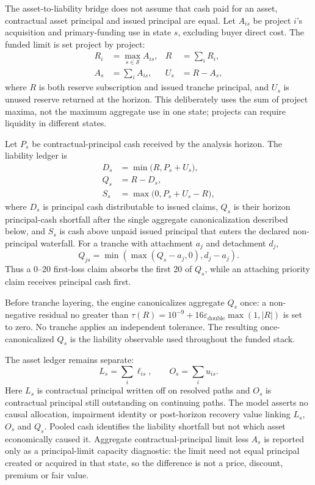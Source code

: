 \documentclass[11pt,a4paper]{article}
\begin{document}
The asset-to-liability bridge does not assume that cash paid for an asset, contractual asset principal and issued principal are equal. Let \(A_{is}\) be project \(i\)'s acquisition and primary-funding use in state \(s\), excluding buyer direct cost. The funded limit is set project by project:
\begin{align}
R_i&=\max_{s\in\mathcal S}A_{is}, & R&=\sum_i R_i,\\
A_s&=\sum_i A_{is}, & U_s&=R-A_s,
\end{align}
where \(R\) is both reserve subscription and issued tranche principal, and \(U_s\) is unused reserve returned at the horizon. This deliberately uses the sum of project maxima, not the maximum aggregate use in one state; projects can require liquidity in different states.

Let \(P_s\) be contractual-principal cash received by the analysis horizon. The liability ledger is
\begin{align}
D_s&=\min\bigl(R,P_s+U_s\bigr),\\
Q_s&=R-D_s,\\
S_s&=\max\bigl(0,P_s+U_s-R\bigr),
\end{align}
where \(D_s\) is principal cash distributable to issued claims, \(Q_s\) is their horizon principal-cash shortfall after the single aggregate canonicalization described below, and \(S_s\) is cash above unpaid issued principal that enters the declared non-principal waterfall. For a tranche with attachment \(a_j\) and detachment \(d_j\),
\begin{equation}
Q_{js}=\min\!\left(\max(Q_s-a_j,0),d_j-a_j\right).
\label{eq:tranche-shortfall}
\end{equation}
Thus a 0--20 first-loss claim absorbs the first 20 of \(Q_s\), while an attaching priority claim receives principal cash first.

Before tranche layering, the engine canonicalizes aggregate \(Q_s\) once: a non-negative residual no greater than \(\tau(R)=10^{-9}+16\varepsilon_{\mathrm{double}}\max(1,|R|)\) is set to zero. No tranche applies an independent tolerance. The resulting once-canonicalized \(Q_s\) is the liability observable used throughout the funded stack.

The asset ledger remains separate:
\begin{equation}
L_s=\sum_i\ell_{is},\qquad O_s=\sum_i u_{is}.
\end{equation}
Here \(L_s\) is contractual principal written off on resolved paths and \(O_s\) is contractual principal still outstanding on continuing paths. The model asserts no causal allocation, impairment identity or post-horizon recovery value linking \(L_s\), \(O_s\) and \(Q_s\). Pooled cash identifies the liability shortfall but not which asset economically caused it. Aggregate contractual-principal limit less \(A_s\) is reported only as a principal-limit capacity diagnostic: the limit need not equal principal created or acquired in that state, so the difference is not a price, discount, premium or fair value.
\end{document}
